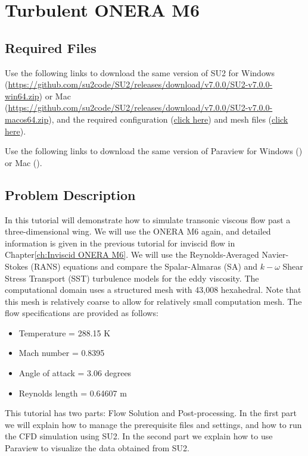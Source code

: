 \chapter{Turbulent ONERA M6}
\label{ch:Turbulent ONERA M6}
\section{Required Files}
\begin{su2note}
	Use the following links to download the same version of SU2 for Windows (\href{}{https://github.com/su2code/SU2/releases/download/v7.0.0/SU2-v7.0.0-win64.zip}) or Mac (\href{}{https://github.com/su2code/SU2/releases/download/v7.0.0/SU2-v7.0.0-macos64.zip}), and the required configuration (\href{}{click here}) and mesh files (\href{}{click here}).
\end{su2note}
\begin{paraviewnote}
	Use the following links to download the same version of Paraview for Windows (\href{}{}) or Mac (\href{}{}).
\end{paraviewnote}
\section{Problem Description}
In this tutorial will demonstrate how to simulate transonic viscous flow past a three-dimensional wing. We will use the ONERA M6 again, and detailed information is given in the previous tutorial for inviscid flow in Chapter\ref{ch:Inviscid ONERA M6}. We will use the Reynolds-Averaged Navier-Stokes (RANS) equations and compare the Spalar-Almaras (SA) and $k-\omega$ Shear Stress Transport (SST) turbulence models for the eddy viscosity. The computational domain uses a structured mesh with 43,008 hexahedral. Note that this mesh is relatively coarse to allow for relatively small computation mesh. The flow specifications are provided as follows:
\begin{itemize}
    \item Temperature = 288.15 K
    \item Mach number = 0.8395
    \item Angle of attack = 3.06 degrees
    \item Reynolds length = 0.64607 m
\end{itemize}
This tutorial has two parts: Flow Solution and Post-processing. In the first part we will explain how to manage the prerequisite files and settings, and how to run the CFD simulation using SU2. In the second part we explain how to use Paraview to visualize the data obtained from SU2.
